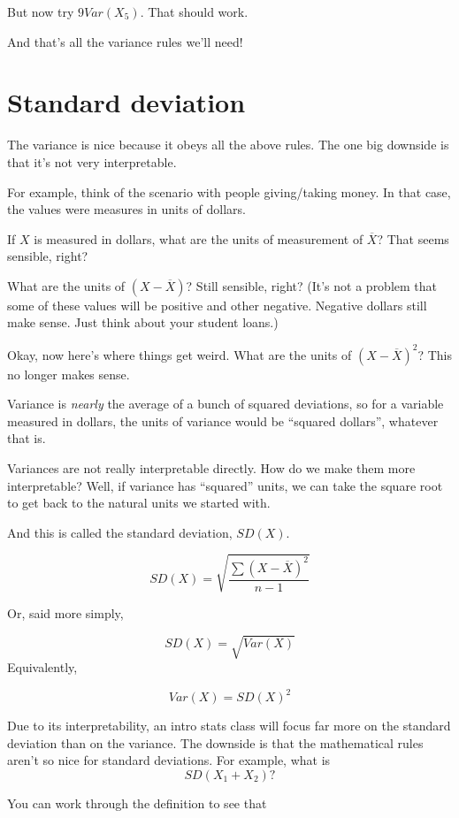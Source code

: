 \documentclass[
]{book}
\begin{document}
But now try \(9 Var\left(X_{5}\right)\). That should work.

And that's all the variance rules we'll need!

\hypertarget{variance-sd}{%
\section{Standard deviation}\label{variance-sd}}

The variance is nice because it obeys all the above rules. The one big downside is that it's not very interpretable.

For example, think of the scenario with people giving/taking money. In that case, the values were measures in units of dollars.

If \(X\) is measured in dollars, what are the units of measurement of \(\overline{X}\)? That seems sensible, right?

What are the units of \(\left(X - \overline{X}\right)\)? Still sensible, right? (It's not a problem that some of these values will be positive and other negative. Negative dollars still make sense. Just think about your student loans.)

Okay, now here's where things get weird. What are the units of \(\left(X - \overline{X}\right)^{2}\)? This no longer makes sense.

Variance is \emph{nearly} the average of a bunch of squared deviations, so for a variable measured in dollars, the units of variance would be ``squared dollars'', whatever that is.

Variances are not really interpretable directly. How do we make them more interpretable? Well, if variance has ``squared'' units, we can take the square root to get back to the natural units we started with.

And this is called the standard deviation, \(SD(X)\).

\[
SD(X) = \sqrt{\frac{\sum{\left(X - \overline{X}\right)^{2}}}
{n - 1}}
\]

Or, said more simply,

\[
SD(X) = \sqrt{Var(X)}
\]
Equivalently,

\[
Var(X) = SD(X)^2
\]

Due to its interpretability, an intro stats class will focus far more on the standard deviation than on the variance. The downside is that the mathematical rules aren't so nice for standard deviations. For example, what is
\[
SD\left(X_{1} + X_{2}\right)?
\]

You can work through the definition to see that
\end{document}
